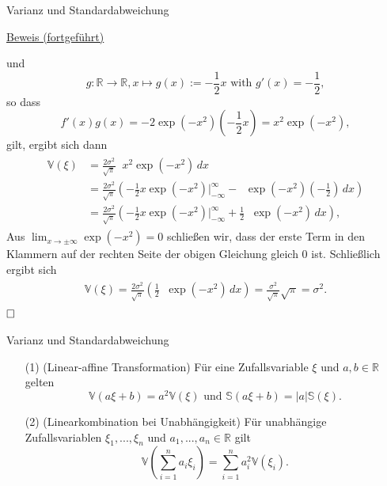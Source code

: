 \documentclass[
  8pt,
  ignorenonframetext,
]{beamer}
\DeclareMathOperator*{\intinf}{\int_{-\infty}^{\infty}}
\begin{document}
\begin{frame}{Varianz und Standardabweichung}
\protect\hypertarget{varianz-und-standardabweichung-6}{}
\footnotesize

\underline{Beweis (fortgeführt)} \vspace{1mm}

und \begin{equation}
g : \mathbb{R} \to \mathbb{R}, x\mapsto g(x) := -\frac{1}{2}x \mbox{ with } g'(x) = -\frac{1}{2},
\end{equation} so dass \begin{equation}
f'(x)g(x) = -2\exp(-x^2)\left(-\frac{1}{2}x \right) = x^2\exp(-x^2),
\end{equation} gilt, ergibt sich dann \begin{align}
\begin{split}
\mathbb{V}(\xi)
& = \frac{2\sigma^2}{\sqrt{\pi}} \intinf x^2 \exp\left(-x^2 \right)\,dx  \\
& = \frac{2\sigma^2}{\sqrt{\pi}}
\left( -\frac{1}{2}x\exp(-x^2)|_{-\infty}^{\infty}
- \intinf \exp\left(-x^2 \right)\left(-\frac{1}{2} \right)\,dx \right)  \\
& = \frac{2\sigma^2}{\sqrt{\pi}}
\left(
 -\frac{1}{2}x\exp(-x^2)|_{-\infty}^{\infty}
+ \frac{1}{2}\intinf \exp\left(-x^2 \right)\,dx
\right),
\end{split}
\end{align} Aus \(\lim_{x\to \pm \infty} \exp(-x^2) = 0\) schließen wir,
dass der erste Term in den Klammern auf der rechten Seite der obigen
Gleichung gleich \(0\) ist. Schließlich ergibt sich \begin{align}
\begin{split}
\mathbb{V}(\xi)
= \frac{2\sigma^2}{\sqrt{\pi}} \left(\frac{1}{2}\intinf \exp\left(-x^2 \right)\,dx\right)
= \frac{\sigma^2}{\sqrt{\pi}} \sqrt{\pi}
= \sigma^2.
\end{split}
\end{align} \(\hfill\Box\)
\end{frame}

\begin{frame}{Varianz und Standardabweichung}
\protect\hypertarget{varianz-und-standardabweichung-7}{}
\small
\begin{theorem}
\normalfont
\justifying
\begin{itemize}
\item[(1)] (Linear-affine Transformation) Für eine Zufallsvariable $\xi$ und 
$a,b\in \mathbb{R}$ gelten
\begin{equation}
\mathbb{V}(a\xi + b) = a^2 \mathbb{V}(\xi)
\mbox{ und }
\mathbb{S}(a\xi + b) = |a|\mathbb{S}(\xi).
\end{equation}
\item [(2)] (Linearkombination bei Unabhängigkeit) Für unabhängige 
Zufallsvariablen $\xi_1,...,\xi_n$ und $a_1,...,a_n \in \mathbb{R}$ gilt
\begin{equation}
\mathbb{V}\left(\sum_{i=1}^n a_i\xi_i\right) = \sum_{i=1}^n a_i^2 \mathbb{V}(\xi_i).
\end{equation}
\end{itemize}
\end{theorem}
\end{frame}
\end{document}

